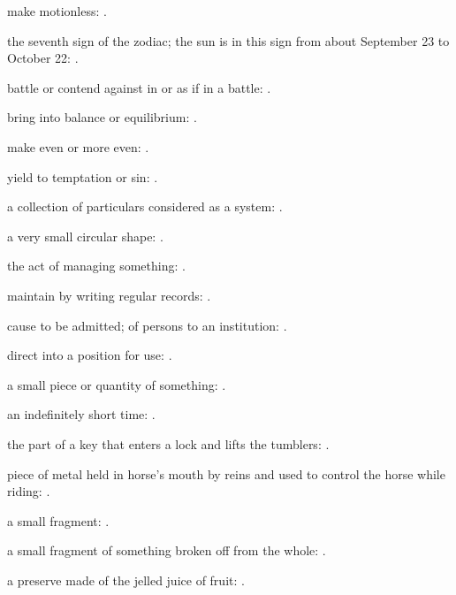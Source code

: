   make motionless: .

  the seventh sign of the zodiac; the sun is in this sign from about September 23 to October 22:   .

  battle or contend against in or as if in a battle:   .

  bring into balance or equilibrium:   .

  make even or more even:   .

  yield to temptation or sin: .

  a collection of particulars considered as a system: .

  a very small circular shape:   .

  the act of managing something:   .

  maintain by writing regular records:   .

  cause to be admitted; of persons to an institution:   .

  direct into a position for use:   .

  a small piece or quantity of something:   .

  an indefinitely short time:   .

  the part of a key that enters a lock and lifts the tumblers: .

  piece of metal held in horse's mouth by reins and used to control the horse while riding: .

  a small fragment:   .

  a small fragment of something broken off from the whole:   .

  a preserve made of the jelled juice of fruit: .

